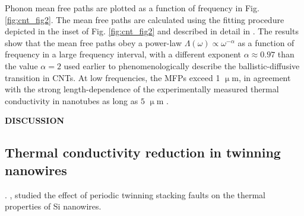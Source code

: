 Phonon mean free paths are plotted as a function of frequency in Fig. \ref{fig:cnt_fig2}. The mean free paths are calculated using the fitting procedure depicted in the inset of Fig. \ref{fig:cnt_fig2} and described in detail in . The results show that the mean free paths obey a power-law $\Lambda(\omega)\propto \omega^{-\alpha}$ as a function of frequency in a large frequency interval, with a different exponent $\alpha\approx 0.97$ than the value $\alpha=2$ used earlier \cite{wang06_apl} to phenomenologically describe the ballistic-diffusive transition in CNTs. At low frequencies, the MFPs exceed 1 $\upmu$m, in agreement with the strong length-dependence of the experimentally measured thermal conductivity in nanotubes as long as $5$ $\upmu$m \cite{chang08}.

\textbf{DISCUSSION}

\subsection{Thermal conductivity reduction in twinning nanowires}

\label{sec:results_twinning}


 \cite{vineis10,shakouri11}.  \cite{hochbaum08,boukai08},   studied the effect of periodic twinning stacking faults \cite{algra08,caroff09} on the thermal properties of Si nanowires. %


